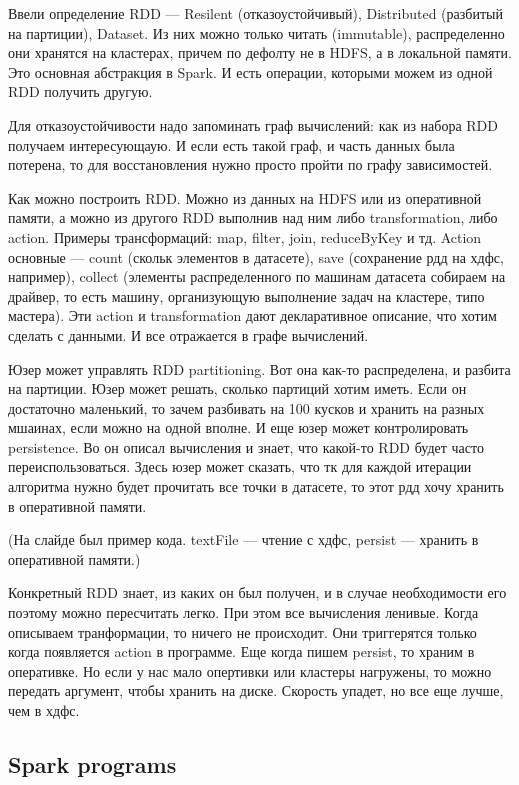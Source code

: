 \documentclass[12pt]{article}
\begin{document}
Ввели определение RDD --- Resilent (отказоустойчивый), Distributed (разбитый на партиции), Dataset. Из них можно только читать (immutable), распределенно они хранятся на кластерах, причем по дефолту не в HDFS, а в локальной памяти. Это основная абстракция в Spark. И есть операции, которыми можем из одной RDD получить другую.

Для отказоустойчивости надо запоминать граф вычислений: как из набора RDD получаем интересующаую. И если есть такой граф, и часть данных была потерена, то для восстановления нужно просто пройти по графу зависимостей.

Как можно построить RDD. Можно из данных на HDFS или из оперативной памяти, а можно из другого RDD выполнив над ним либо transformation, либо action. Примеры трансформаций: map, filter, join, reduceByKey и тд. Action основные --- count (скольк элементов в датасете), save (сохранение рдд на хдфс, например), collect (элементы распределенного по машинам датасета собираем на драйвер, то есть машину, организующую выполнение задач на кластере, типо мастера). Эти action и transformation дают декларативное описание, что хотим сделать с данными. И все отражается в графе вычислений.
    
Юзер может управлять RDD partitioning. Вот она как-то распределена, и разбита на партиции. Юзер может решать, сколько партиций хотим иметь. Если он достаточно маленький, то зачем разбивать на 100 кусков и хранить на разных мшаинах, если можно на одной вполне. И еще юзер может контролировать persistence. Во он описал вычисления и знает, что какой-то RDD будет часто переиспользоваться. Здесь юзер может сказать, что тк для каждой итерации алгоритма нужно будет прочитать все точки в датасете, то этот рдд хочу хранить в оперативной памяти.

(На слайде был пример кода. textFile --- чтение с хдфс, persist --- хранить в оперативной памяти.)

Конкретный RDD знает, из каких он был получен, и в случае необходимости его поэтому можно пересчитать легко. При этом все вычисления ленивые. Когда описываем транформации, то ничего не происходит. Они триггерятся только когда появляется action в программе. Еще когда пишем persist, то храним в оперативке. Но если у нас мало опертивки или кластеры нагружены, то можно передать аргумент, чтобы хранить на диске. Скорость упадет, но все еще лучше, чем в хдфс. 

\subsection{Spark programs}
\end{document}
